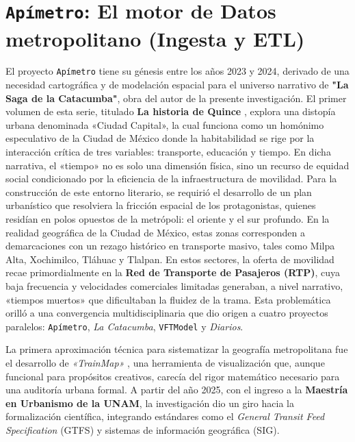 
\section{\texorpdfstring{\texttt{Apímetro}}{Apímetro}: El motor de Datos metropolitano (Ingesta y ETL)}
\label{sec:apimetro-intro}

El proyecto \texttt{Apímetro} tiene su génesis entre los años 2023 y 2024,
derivado de una necesidad cartográfica y de modelación espacial para el universo
narrativo de \textbf{"La Saga de la Catacumba"}, obra del autor de la presente
investigación. El primer volumen de esta serie, titulado
\textbf{La historia de Quince} \citep{historia_quince}, explora una distopía urbana denominada «Ciudad
Capital», la cual funciona como un homónimo especulativo de la Ciudad de México
donde la habitabilidad se rige por la interacción crítica de tres variables:
transporte, educación y tiempo. En dicha narrativa, el «tiempo» no es solo una
dimensión física, sino un recurso de equidad social condicionado por la
eficiencia de la infraestructura de movilidad. Para la construcción de este
entorno literario, se requirió el desarrollo de un plan urbanístico que
resolviera la fricción espacial de los protagonistas, quienes residían en polos
opuestos de la metrópoli: el oriente y el sur profundo. En la realidad
geográfica de la Ciudad de México, estas zonas corresponden a demarcaciones con
un rezago histórico en transporte masivo, tales como Milpa Alta, Xochimilco,
Tláhuac y Tlalpan. En estos sectores, la oferta de movilidad recae
primordialmente en la \textbf{Red de Transporte de Pasajeros (RTP)}, cuya baja
frecuencia y velocidades comerciales limitadas generaban, a nivel narrativo,
«tiempos muertos» que dificultaban la fluidez de la trama. Esta problemática
orilló a una convergencia multidisciplinaria que dio origen a cuatro proyectos
paralelos: \texttt{Apímetro}, \textit{La Catacumba}, \texttt{VFTModel} y
\textit{Diarios}.

La primera aproximación técnica para sistematizar la geografía metropolitana fue
el desarrollo de \textit{«TrainMap»} \citep{cabrera_trainmap}, una herramienta de visualización que,
aunque funcional para propósitos creativos, carecía del rigor matemático
necesario para una auditoría urbana formal. A partir del año 2025, con el
ingreso a la \textbf{Maestría en Urbanismo de la UNAM}, la investigación dio un
giro hacia la formalización científica, integrando estándares como el
\textit{General Transit Feed Specification} (GTFS) y sistemas de información
geográfica (SIG).

